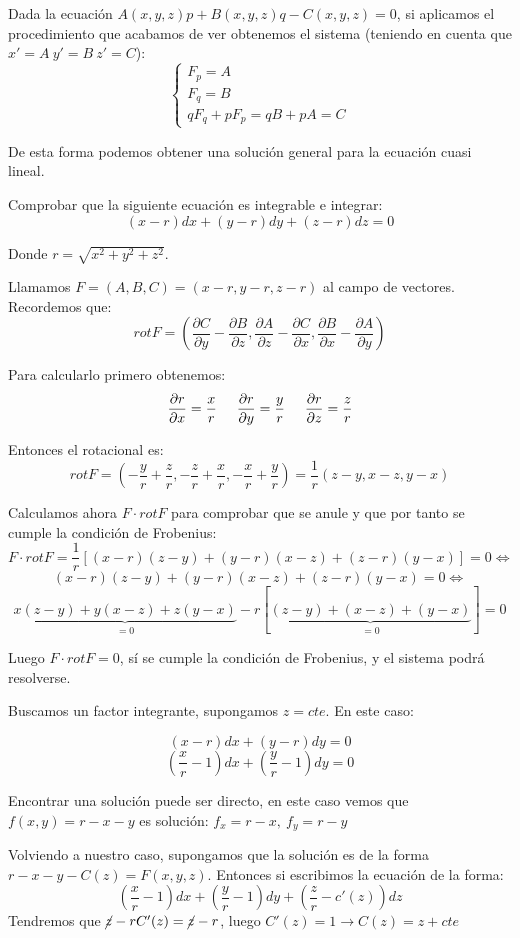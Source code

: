 \documentclass[openany]{book}
\begin{document}
Dada la ecuación $ A(x,y,z)p+B(x,y,z)q-C(x,y,z)=0 $, si aplicamos el procedimiento que acabamos de ver obtenemos el sistema (teniendo en cuenta que $ x'=A\ y'=B\ z'=C $):
$$ \left\{
\begin{array}{l}
  F_{p} = A\\ 
  F_{q} = B\\ 
  qF_{q}+pF_{p} = qB+pA = C
\end{array}
\right. $$

De esta forma podemos obtener una solución general para la ecuación cuasi lineal.

\begin{example}
  Comprobar que la siguiente ecuación es integrable e integrar:
  $$ (x-r)dx + (y-r)dy + (z-r)dz = 0 $$

  Donde $ r = \sqrt{x^2+y^2+z^2} $.

  Llamamos $ F=(A,B,C) = (x-r,y-r,z-r) $ al campo de vectores. Recordemos que:
  $$ rot F = \left( \dfrac{\partial C}{\partial y}- \dfrac{\partial B}{\partial z}, \dfrac{\partial A}{\partial z} -  \dfrac{\partial C}{\partial x}, \dfrac{\partial B}{\partial x}- \dfrac{\partial A}{\partial y} \right) $$

  Para calcularlo primero obtenemos:
  $$ \dfrac{\partial r}{\partial x} = \dfrac{x}{r} \hspace{5mm} \dfrac{\partial r}{\partial y} = \dfrac{y}{r} \hspace{5mm} \dfrac{\partial r}{\partial z} = \dfrac{z}{r} $$

  Entonces el rotacional es:
  $$ rot F = \left( -\dfrac{y}{r}+\dfrac{z}{r},-\dfrac{z}{r}+\dfrac{x}{r},-\dfrac{x}{r}+\dfrac{y}{r} \right) = \dfrac{1}{r} (z-y,x-z,y-x) $$

  Calculamos ahora $ F \cdot rot F $ para comprobar que se anule y que por tanto se cumple la condición de Frobenius:
  $$ F \cdot  rot F =\dfrac{1}{r} [(x-r)(z-y) + (y-r)(x-z)+(z-r)(y-x)] = 0 \iff  $$
  $$ (x-r)(z-y) + (y-r)(x-z)+(z-r)(y-x) = 0 \iff $$
  $$\underbrace{x(z-y)+y(x-z)+z(y-x)}_{=0} -r[\underbrace{(z-y)+(x-z)+(y-x)}_{=0}] = 0 $$
  
  Luego $ F \cdot  rot F=0 $, sí se cumple la condición de Frobenius, y el sistema podrá resolverse.
  
  Buscamos un factor integrante, supongamos $ z =cte $. En este caso:

  $$ (x-r)dx + (y-r)dy = 0 $$
  $$ \left(\dfrac{x}{r}-1\right)dx + \left(\dfrac{y}{r}-1\right)dy = 0 $$

  Encontrar una solución puede ser directo, en este caso vemos que $ f(x,y)=r-x-y $ es solución: $ f_{x} = r-x,\ f_{y} = r-y $

  Volviendo a nuestro caso, supongamos que la solución es de la forma $ r-x-y-C(z) = F(x,y,z) $. Entonces si escribimos la ecuación de la forma:
  $$ \left(\dfrac{x}{r}-1\right) dx +\left(\dfrac{y}{r}-1\right)dy +\left(\dfrac{z}{r}-c'(z)\right) dz $$
  Tendremos que $ \cancel{z}-rC'(z) =\cancel{z}-r $, luego $ C'(z)=1 \to C(z) = z+cte $

\end{example}
\end{document}
